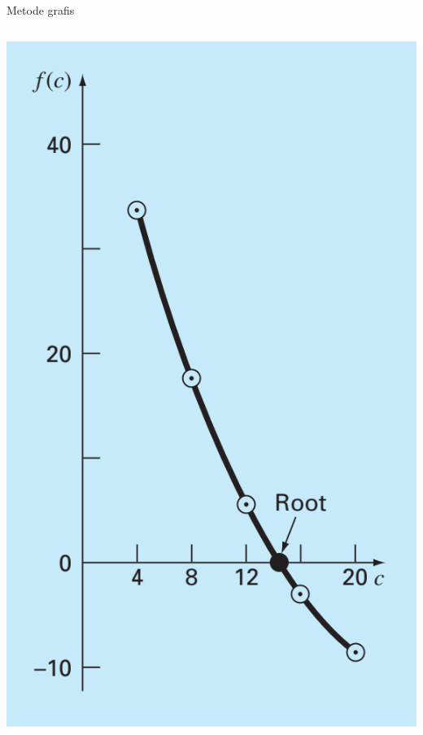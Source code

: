 \begin{frame}{Metode grafis}
\begin{columns}
\begin{column}{0.4\textwidth}
  {\centering
  \includegraphics[height=0.8\textheight]{../chapra_7th/Chapra_Fig_5_1.png}
  \par}
\end{column}

\end{columns}



\end{frame}



